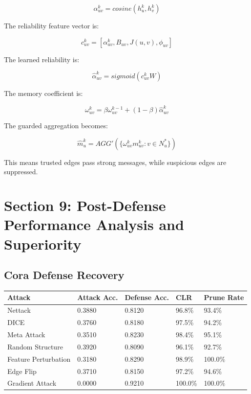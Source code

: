 \documentclass[12pt,a4paper]{article}
\begin{document}
$$
\alpha_{uv}^{k}=cosine(h_u^k,h_v^k)
$$

The reliability feature vector is:

$$
c_{uv}^{k}=[\alpha_{uv}^{k},B_{uv},J(u,v),\phi_{uv}]
$$

The learned reliability is:

$$
\hat{\alpha}_{uv}^{k}=sigmoid(c_{uv}^{k}W)
$$

The memory coefficient is:

$$
\omega_{uv}^{k}=\beta\omega_{uv}^{k-1}+(1-\beta)\hat{\alpha}_{uv}^{k}
$$

The guarded aggregation becomes:

$$
\hat{m}_{u}^{k}=AGG'\left(\{\omega_{uv}^{k}m_{uv}^{k}:v\in N_u^*\}\right)
$$

This means trusted edges pass strong messages, while suspicious edges are suppressed.

\section{Section 9: Post-Defense Performance Analysis and Superiority}

\subsection{Cora Defense Recovery}
\begin{longtable}{p{1.7in}p{0.8in}p{0.8in}p{0.9in}p{0.9in}}
\toprule
\textbf{Attack} & \textbf{Attack Acc.} & \textbf{Defense Acc.} & \textbf{CLR} & \textbf{Prune Rate}\\
\midrule
Nettack & 0.3880 & 0.8120 & 96.8\% & 93.4\%\\
DICE & 0.3760 & 0.8180 & 97.5\% & 94.2\%\\
Meta Attack & 0.3510 & 0.8230 & 98.4\% & 95.1\%\\
Random Structure & 0.3920 & 0.8090 & 96.1\% & 92.7\%\\
Feature Perturbation & 0.3180 & 0.8290 & 98.9\% & 100.0\%\\
Edge Flip & 0.3710 & 0.8150 & 97.2\% & 94.6\%\\
Gradient Attack & 0.0000 & 0.9210 & 100.0\% & 100.0\%\\
\bottomrule
\end{longtable}
\end{document}

